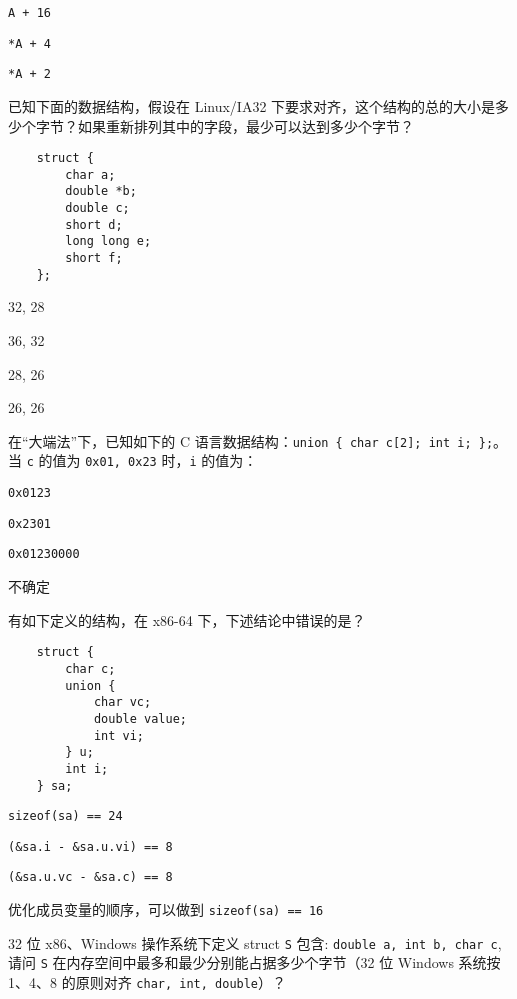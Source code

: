 \begin{problems}
\begin{choices}
            \item \verb|A + 16|
            \item \verb|*A + 4|
            \item \verb|*A + 2|
        \end{choices}
         已知下面的数据结构，假设在 Linux/IA32 下要求对齐，这个结构的总的大小是多少个字节？如果重新排列其中的字段，最少可以达到多少个字节？
        \begin{verbatim}
    struct {
        char a;
        double *b;
        double c;
        short d;
        long long e;
        short f;
    };
        \end{verbatim}
        \begin{choices}
            \item 32, 28
            \item 36, 32
            \item 28, 26
            \item 26, 26
        \end{choices}
         在“大端法”下，已知如下的 C 语言数据结构：\verb|union { char c[2]; int i; };|。当 \verb|c| 的值为 \verb|0x01, 0x23| 时，\verb|i| 的值为：
        \begin{choices}
            \item \verb|0x0123|
            \item \verb|0x2301|
            \item \verb|0x01230000|
            \item 不确定
        \end{choices}
         有如下定义的结构，在 x86-64 下，下述结论中错误的是？
        \begin{verbatim}
    struct {
        char c;
        union {
            char vc;
            double value;
            int vi;
        } u;
        int i;
    } sa;
        \end{verbatim}
        \begin{choices}
            \item \verb|sizeof(sa) == 24|
            \item \verb|(&sa.i - &sa.u.vi) == 8|
            \item \verb|(&sa.u.vc - &sa.c) == 8|
            \item 优化成员变量的顺序，可以做到 \verb|sizeof(sa) == 16|
        \end{choices}
         32 位 x86、Windows 操作系统下定义 struct \verb|S| 包含: \verb|double a, int b, char c|, 请问 \verb|S| 在内存空间中最多和最少分别能占据多少个字节（32 位 Windows 系统按 1、4、8 的原则对齐 \verb|char, int, double|）？

\end{problems}
